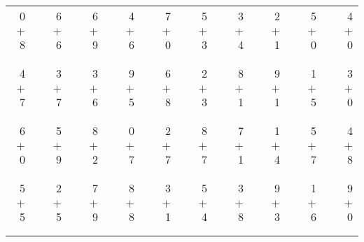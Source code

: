 \documentclass[12pt, letterpaper]{article}
\begin{document}
\begin{tabular}{rrrrrrrrrrrrrrrrrrr}
0 & & 6 & & 6 & & 4 & & 7 & & 5 & & 3 & & 2 & & 5 & & 4\\
$+$ 8 & & $+$ 6 & & $+$ 9 & & $+$ 6 & & $+$ 0 & & $+$ 3 & & $+$ 4 & & $+$ 1 & & $+$ 0 & & $+$ 0\\
\cline{1-1} \cline{3-3} \cline{5-5} \cline{7-7} \cline{9-9} \cline{11-11} \cline{13-13} \cline{15-15} \cline{17-17} \cline{19-19} \\ \\
4 & & 3 & & 3 & & 9 & & 6 & & 2 & & 8 & & 9 & & 1 & & 3\\
$+$ 7 & & $+$ 7 & & $+$ 6 & & $+$ 5 & & $+$ 8 & & $+$ 3 & & $+$ 1 & & $+$ 1 & & $+$ 5 & & $+$ 0\\
\cline{1-1} \cline{3-3} \cline{5-5} \cline{7-7} \cline{9-9} \cline{11-11} \cline{13-13} \cline{15-15} \cline{17-17} \cline{19-19} \\ \\
6 & & 5 & & 8 & & 0 & & 2 & & 8 & & 7 & & 1 & & 5 & & 4\\
$+$ 0 & & $+$ 9 & & $+$ 2 & & $+$ 7 & & $+$ 7 & & $+$ 7 & & $+$ 1 & & $+$ 4 & & $+$ 7 & & $+$ 8\\
\cline{1-1} \cline{3-3} \cline{5-5} \cline{7-7} \cline{9-9} \cline{11-11} \cline{13-13} \cline{15-15} \cline{17-17} \cline{19-19} \\ \\
5 & & 2 & & 7 & & 8 & & 3 & & 5 & & 3 & & 9 & & 1 & & 9\\
$+$ 5 & & $+$ 5 & & $+$ 9 & & $+$ 8 & & $+$ 1 & & $+$ 4 & & $+$ 8 & & $+$ 3 & & $+$ 6 & & $+$ 0\\
\cline{1-1} \cline{3-3} \cline{5-5} \cline{7-7} \cline{9-9} \cline{11-11} \cline{13-13} \cline{15-15} \cline{17-17} \cline{19-19} \\ \\
\end{tabular}
\newpage
\end{document}
